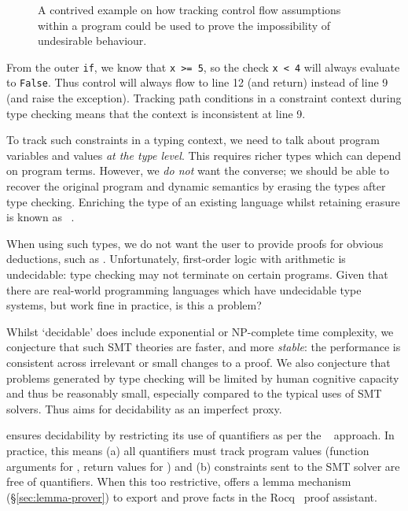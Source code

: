 \begin{figure}[h]
    \inputminted[linenos,numbersep=6pt,mathescape,fontsize=\small]{py}{code/dead_code.py}
    \caption{A contrived example on how tracking control flow assumptions
        within a program could be used to prove the impossibility of
        undesirable behaviour.}\label{fig:dead-code}
\end{figure}

From the outer \texttt{if}, we know that \texttt{x >= 5}, so
the check \texttt{x < 4} will always evaluate to \texttt{False}.
Thus control will always flow to line 12 (and return) instead of line 9 (and
raise the exception). Tracking path conditions in a constraint context during
type checking means that the context is inconsistent at line 9.

To track such constraints in a typing context, we need to talk about program
variables and values \emph{at the type level}. This requires richer types which
can depend on program terms. However, we \emph{do not} want the converse; we
should be able to recover the original program and dynamic semantics by erasing
the types after type checking. Enriching the type of an existing language
whilst retaining erasure is known as ~.

When using such types, we do not want the user to provide proofs for obvious
deductions, such as . Unfortunately,
first-order logic with arithmetic is undecidable: type checking may not
terminate on certain programs. Given that there are real-world programming
languages which have
undecidable type systems, but work fine in practice, is this a problem?

Whilst `decidable' does include exponential or NP-complete time complexity, we
conjecture that such SMT theories are faster, and more \emph{stable}: the
performance is consistent across irrelevant or small changes to a proof. We
also conjecture that problems generated by type checking will be limited by
human cognitive capacity and thus be reasonably small, especially compared to the
typical uses of SMT solvers. Thus  aims for decidability as an imperfect
proxy.

 ensures decidability by restricting its use of quantifiers as per the
~ approach. In practice, this means (a)
all quantifiers must track program values (function arguments for \sm{\forall},
return values for \sm{\exists}) and (b) constraints sent to the SMT solver are
free of quantifiers. When this too restrictive,  offers a lemma
mechanism (\S\ref{sec:lemma-prover}) to export and prove facts in the
Rocq~ proof assistant.

